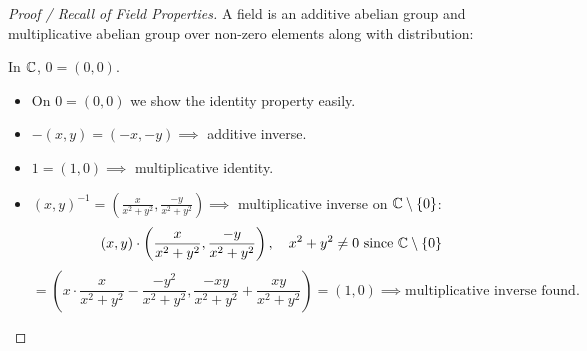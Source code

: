 \documentclass[11pt]{article}
\begin{document}
\begin{proof}[Proof / Recall of Field Properties]
A field is an additive abelian group and multiplicative abelian group over non-zero elements along with distribution:

In ${\mathbb{C}}$, $0 = (0,0)$.
\begin{itemize}
    \item On $0 = (0,0)$ we show the identity property easily.
    \item $-(x,y) = (-x,-y) \implies$ additive inverse.
    \item $1 = (1,0) \implies$ multiplicative identity.
    \item $(x,y)^{-1} = \left(\frac{x}{x^2+y^2}, \frac{-y}{x^2+y^2}\right) \implies$ multiplicative inverse on ${\mathbb{C}}\setminus\{0\}$:
    \[
    (x,y) \cdot \left(\frac{x}{x^2+y^2}, \frac{-y}{x^2+y^2}\right), \quad x^2+y^2 \neq 0 \text{ since } {\mathbb{C}}\setminus\{0\}
    \]
    \[
    = \left(x\cdot \frac{x}{x^2+y^2} - \frac{-y^2}{x^2+y^2}, \frac{-xy}{x^2+y^2} + \frac{xy}{x^2+y^2}\right) = (1,0) \implies \text{multiplicative inverse found}.
    \]
\end{itemize}


\end{proof}
\end{document}
